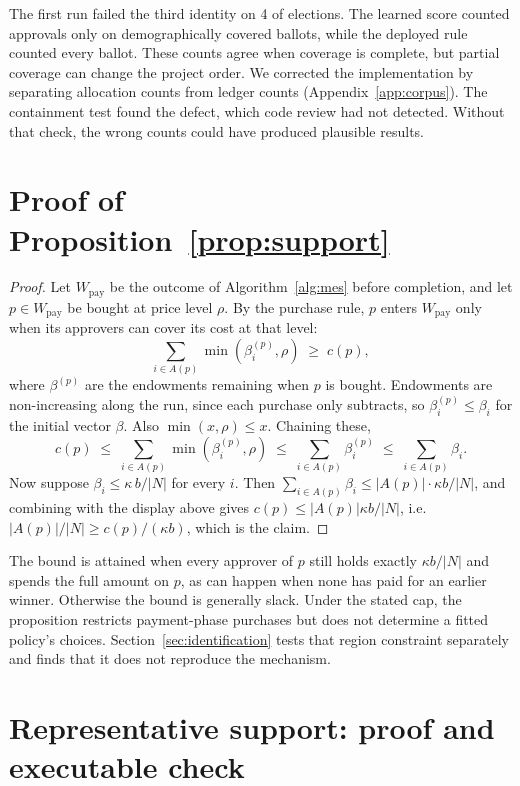 The first run failed the third identity on 4 of \PrimaryElectionN{} elections.
The learned score counted approvals only on demographically covered ballots,
while the deployed rule counted every ballot. These counts agree when coverage
is complete, but partial coverage can change the project order. We corrected
the implementation by separating allocation counts from ledger counts
(Appendix~\ref{app:corpus}). The containment test found the defect, which code
review had not detected. Without that check, the wrong counts could have
produced plausible results.

\section{Proof of Proposition~\ref{prop:support}}
\label{app:proof}

\begin{proof}
Let $W_{\mathrm{pay}}$ be the outcome of Algorithm~\ref{alg:mes} before
completion, and let $p \in W_{\mathrm{pay}}$ be bought at price level $\rho$.
By the purchase rule, $p$ enters $W_{\mathrm{pay}}$
only when its approvers can cover its cost at that level:
\[
\sum_{i \in A(p)} \min(\beta_i^{(p)}, \rho) \;\ge\; c(p),
\]
where $\beta^{(p)}$ are the endowments remaining when $p$ is bought. Endowments
are non-increasing along the run, since each purchase only subtracts, so
$\beta_i^{(p)} \le \beta_i$ for the initial vector $\beta$. Also
$\min(x, \rho) \le x$. Chaining these,
\[
c(p) \;\le\; \sum_{i \in A(p)} \min(\beta_i^{(p)}, \rho)
      \;\le\; \sum_{i \in A(p)} \beta_i^{(p)}
      \;\le\; \sum_{i \in A(p)} \beta_i .
\]
Now suppose $\beta_i \le \kappa\, b/|N|$ for every $i$. Then
$\sum_{i \in A(p)} \beta_i \le |A(p)| \cdot \kappa b / |N|$, and combining with
the display above gives $c(p) \le |A(p)| \kappa b / |N|$, i.e.
$|A(p)|/|N| \ge c(p)/(\kappa b)$, which is the claim.
\end{proof}

The bound is attained when every approver of $p$ still holds exactly
$\kappa b/|N|$ and spends the full amount on $p$, as can happen when none has
paid for an earlier winner. Otherwise the bound is generally slack. Under the
stated cap, the proposition restricts payment-phase purchases but does not
determine a fitted policy's choices. Section~\ref{sec:identification} tests that
region constraint separately and finds that it does not reproduce the
mechanism.

\section{Representative support: proof and executable check}
\label{app:degeneracy}

